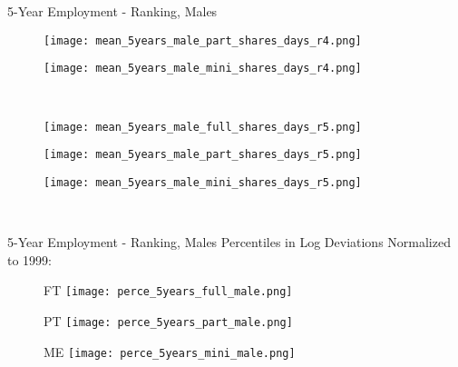 \documentclass[hyperref={bookmarks=false}]{beamer}
\begin{document}
\begin{appendix}
\begin{frame}{5-Year Employment - Ranking, Males}
\begin{figure}[!t]
\begin{minipage}[b]{0.15\textwidth}{}
\centering
\texttt{[image: mean\_5years\_male\_part\_shares\_days\_r4.png]}
\end{minipage}
\begin{minipage}[b]{0.15\textwidth}{}
\centering
\texttt{[image: mean\_5years\_male\_mini\_shares\_days\_r4.png]}
\end{minipage}\\
\begin{minipage}[b]{0.15\textwidth}{}
\centering
\texttt{[image: mean\_5years\_male\_full\_shares\_days\_r5.png]}
\end{minipage}
\begin{minipage}[b]{0.15\textwidth}{}
\centering
\texttt{[image: mean\_5years\_male\_part\_shares\_days\_r5.png]}
\end{minipage}
\begin{minipage}[b]{0.15\textwidth}{}
\centering
\texttt{[image: mean\_5years\_male\_mini\_shares\_days\_r5.png]}
\end{minipage}\\
\end{figure}
\end{frame}

\begin{frame}{5-Year Employment - Ranking, Males}
Percentiles in Log Deviations Normalized to 1999:
\begin{figure}[!t]
\begin{minipage}[b]{0.3\textwidth}{FT}
\centering
\texttt{[image: perce\_5years\_full\_male.png]}
\end{minipage}
\begin{minipage}[b]{0.3\textwidth}{PT}
\centering
\texttt{[image: perce\_5years\_part\_male.png]}
\end{minipage}
\begin{minipage}[b]{0.3\textwidth}{ME}
\centering
\texttt{[image: perce\_5years\_mini\_male.png]}
\end{minipage}\\
\end{figure}
\end{frame}


\end{appendix}
\end{document}

